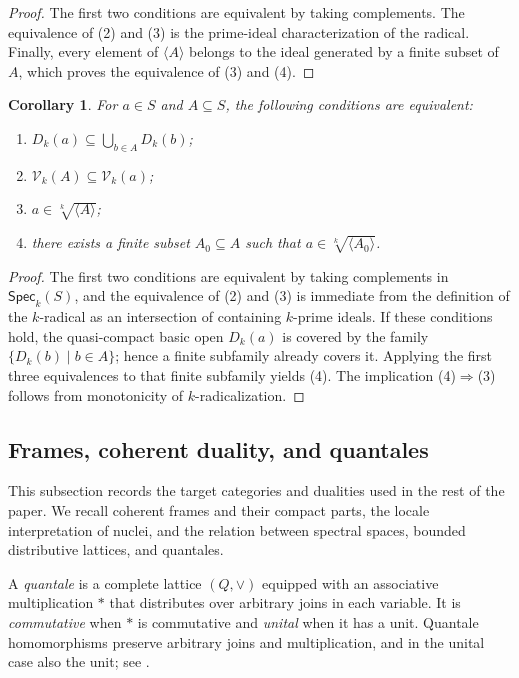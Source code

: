 \documentclass[12pt,leqno]{amsart}
\newcommand{\Speck}{\mathsf{Spec}_{k}}
\newtheorem{corollary}[theorem]{Corollary}
\theoremstyle{definition}
\numberwithin{equation}{section}
\theoremstyle{remark}
\begin{document}
\begin{proof}
The first two conditions are equivalent by taking complements. The equivalence of (2) and (3) is the prime-ideal characterization of the radical. Finally, every element of \(\langle A\rangle\) belongs to the ideal generated by a finite subset of $A$, which proves the equivalence of (3) and (4).
\end{proof}

\begin{corollary}\label{cor:k-basic-open-cover}
For \(a\in S\) and \(A\subseteq S\), the following conditions are equivalent:
\begin{enumerate}
\item \(D_k(a)\subseteq\bigcup_{b\in A}D_k(b)\);
\item \(\mathcal V_k(A)\subseteq\mathcal V_k(a)\);
\item \(a\in\sqrt[k]{\langle A\rangle}\);
\item there exists a finite subset \(A_0\subseteq A\) such that
\(a\in\sqrt[k]{\langle A_0\rangle}\).
\end{enumerate}
\end{corollary}

\begin{proof}
The first two conditions are equivalent by taking complements in \(\Speck(S)\), and the equivalence of (2) and (3) is immediate from the definition of the $k$-radical as an intersection of containing $k$-prime ideals. If these conditions hold, the quasi-compact basic open \(D_k(a)\) is covered by the family \(\{D_k(b)\mid b\in A\}\); hence a finite subfamily already covers it. Applying the first three equivalences to that finite subfamily yields (4). The implication (4)$\Rightarrow$(3) follows from monotonicity of $k$-radicalization.
\end{proof}

\subsection{Frames, coherent duality, and quantales}

This subsection records the target categories and dualities used in the rest of the paper. We recall coherent frames and their compact parts, the locale interpretation of nuclei, and the relation between spectral spaces, bounded distributive lattices, and quantales.

A \emph{quantale} is a complete lattice \((Q,\vee)\) equipped with an associative multiplication $*$ that distributes over arbitrary joins in each variable. It is \emph{commutative} when $*$ is commutative and \emph{unital} when it has a unit. Quantale homomorphisms preserve arbitrary joins and multiplication, and in the unital case also the unit; see \cite{Ros90}.
\end{document}
